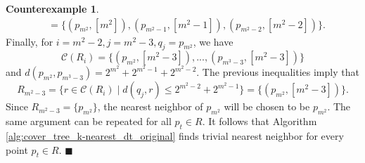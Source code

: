 \documentclass{vgtc}                          %
\numberwithin{algocf}{section}
\theoremstyle{definition}
\theoremstyle{definition}
\theoremstyle{definition}
\newtheorem{cexa}[algocf]{Counterexample}
\theoremstyle{plain}
\newcommand{\C}{\mathcal{C}}
\newcommand{\bs}{\hfill $\blacksquare$}
\begin{document}
\begin{cexa}
\begin{align*}
	    &= \{(p_{m^2},[m^2]), (p_{m^2-1}, [m^2-1]), (p_{m^2-2}, [m^2-2])\}.
	\end{align*}
	Finally, for $i = m^2-2, j = m^2-3, q_j = p_{m^2}$, we have $$\C(R_i) =  \{(p_{m^2},[m^2-3]), ... , (p_{m^3-3},[m^2-3])\}$$ and 
	$d(p_{m^2}, p_{m^3-3}) = 2^{m^2} + 2^{m^2-1} + 2^{m^2-2}$. The previous inequalities imply that
	$$R_{m^2-3} =  \{r \in \C(R_i) \mid d(q_j,r) \leq 2^{m^2-2} + 2^{m^{2}-1} \} = \{(p_{m^2}, [m^2-3])\}.$$
	Since  $R_{m^2 -3} = \{p_{m^2}\}$, the nearest neighbor of $p_{m^2}$ will be chosen to be $p_{m^2}$. 
	The same argument can be repeated for all $p_t \in R$. 
	It follows that Algorithm \ref{alg:cover_tree_k-nearest_dt_original} finds trivial nearest neighbor for every point $p_t \in R$. 
	\bs
\end{cexa}


%   

%    




\end{document}
